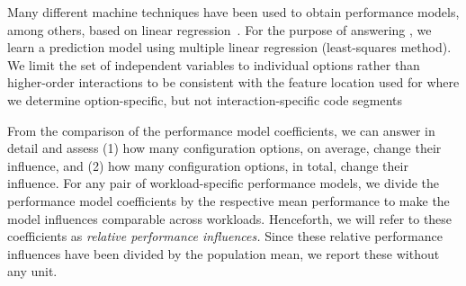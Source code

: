Many different machine techniques have been used to obtain performance models, among others, based on linear regression~\cite{perLasso,siegmundPerformanceinfluenceModelsHighly2015,dorn2020}. For the purpose of answering , we learn a prediction model using multiple linear regression (least-squares method). We limit the set of independent variables to individual options rather than higher-order interactions to be consistent with the feature location used for  where we determine option-specific, but not interaction-specific code segments

From the comparison of the performance model coefficients, we can answer  in detail and assess (1) how many configuration options, on average, change their influence, and (2) how many configuration options, in total, change their influence. For any pair of workload-specific performance models, we divide the performance model coefficients by the respective mean performance to make the model influences comparable across workloads. Henceforth, we will refer to these coefficients as \textit{relative performance influences.} {\color{blue!60!black}Since these relative performance influences have been divided by the population mean, we report these without any unit.}


